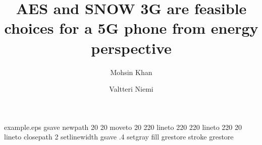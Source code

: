 %
%
%
%
%
\begin{filecontents*}{example.eps}
gsave
newpath
  20 20 moveto
  20 220 lineto
  220 220 lineto
  220 20 lineto
closepath
2 setlinewidth
gsave
  .4 setgray fill
grestore
stroke
grestore
\end{filecontents*}
%
\RequirePackage{fix-cm}
%
\documentclass[twocolumn]{svjour3}       %
%
\smartqed  %
%
\usepackage{graphicx}

\usepackage{color}
\usepackage[numbers]{natbib}
\usepackage{calc}



%
%
%
%
%


\title{AES and SNOW 3G are feasible choices for a 5G phone from energy perspective %
}


\author{Mohsin Khan         \and
        Valtteri Niemi %
}

